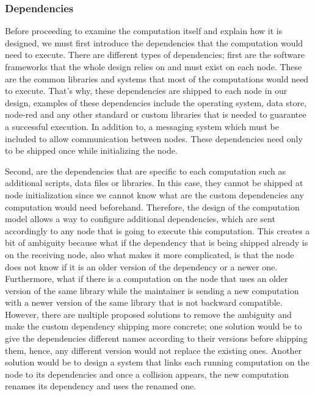 \newpage


\subsubsection{Dependencies}

Before proceeding to examine the computation itself and explain how it is designed, we must first introduce the dependencies that the computation would need to execute. There are different types of dependencies; first are the software frameworks that the whole design relies on and must exist on each node. These are the common libraries and systems that most of the computations would need to execute. That's why, these dependencies are shipped to each node in our design, examples of these dependencies include the operating system, data store, node-red and any other standard or custom libraries that is needed to guarantee a successful execution. In addition to, a messaging system which must be included to allow communication between nodes. These dependencies need only to be shipped once while initializing the node.

 Second, are the dependencies that are specific to each computation such as additional scripts, data files or libraries. In this case, they cannot be shipped at node initialization since we cannot know what are the custom dependencies any computation would need beforehand. Therefore, the design of the computation model allows a way to configure additional dependencies, which are sent accordingly to any node that is going to execute this computation.
  This creates a bit of ambiguity because what if the dependency that is being shipped  already is on the receiving node, also what makes it more complicated, is that the node does not know if it is an older version of the dependency or a newer one. Furthermore, what if there is a computation on the node that uses an older version of the same library while the maintainer is sending a new computation with a newer version of the same library that is not backward compatible. However, there are multiple proposed solutions to remove the ambiguity and make the custom dependency shipping more concrete; one solution would be to give the dependencies different names according to their versions before shipping them, hence, any different version would not replace the existing ones. Another solution would be to design a system that links each running computation on the node to its dependencies and once a collision appears, the new computation renames its dependency and uses the renamed one.
 

